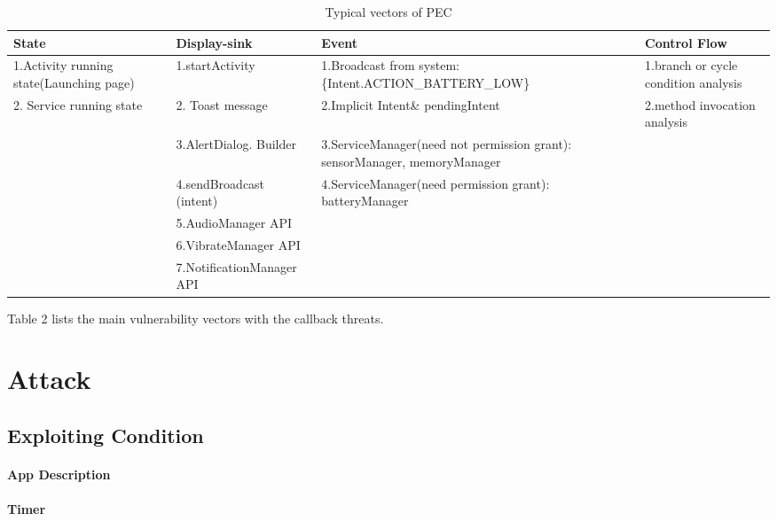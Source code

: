 \documentclass{sig-alternate-05-2015}
\begin{document}
\begin{table}[htbp]
\centering
 \caption{\label{tab:test} Typical vectors of PEC}
 \begin{tabularx}{\linewidth}{XXXX}

  \toprule
  State & Display-sink & Event & Control Flow \\
  \midrule
 1.Activity running state(Launching page) & 1.startActivity & 1.Broadcast from system: \{Intent.ACTION\_BATTERY\_LOW\} & 1.branch or cycle condition analysis \\
  2. Service running state &2. Toast message & 2.Implicit Intent\& pendingIntent & 2.method invocation analysis\\
     & 3.AlertDialog. Builder & 3.ServiceManager(need not permission grant): { sensorManager, memoryManager }\\
     & 4.sendBroadcast (intent)& 4.ServiceManager(need permission grant): { batteryManager }\\     
     & 5.AudioManager API & \\
     & 6.VibrateManager API & \\
     & 7.NotificationManager API & \\
     
  \bottomrule
 \end{tabularx}
\end{table}



{\color{red}Table 2} lists the main vulnerability vectors with the callback threats. 

\section{Attack}

\subsection{Exploiting Condition}
\paragraph{App Description}
\paragraph{Timer}
\end{document}
